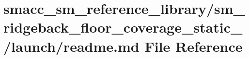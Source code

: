 \hypertarget{smacc__sm__reference__library_2sm__ridgeback__floor__coverage__static__1_2launch_2readme_8md}{}\section{smacc\+\_\+sm\+\_\+reference\+\_\+library/sm\+\_\+ridgeback\+\_\+floor\+\_\+coverage\+\_\+static\+\_/launch/readme.md File Reference}
\label{smacc__sm__reference__library_2sm__ridgeback__floor__coverage__static__1_2launch_2readme_8md}
